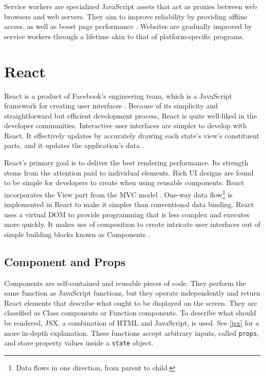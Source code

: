 Service workers are specialized JavaScript assets that act as proxies between web browsers and web servers. They aim to improve reliability by providing offline access, as well as boost page performance \autocite{chrome2021service}. Websites are gradually improved by service workers through a lifetime akin to that of platform-specific programs.


\section{React}
\label{react}
React is a product of Facebook's engineering team, which is a JavaScript framework for creating user interfaces \autocite{gackenheimer2015introducing}. Because of its simplicity and straightforward but efficient development process, React is quite well-liked in the developer communities. Interactive user interfaces are simpler to develop with React. It effectively updates by accurately drawing each state's view's constituent parts, and it updates the application's data \autocite{islam2017reactjs}.

React's primary goal is to deliver the best rendering performance. Its strength stems from the attention paid to individual elements. Rich UI designs are found to be simple for developers to create when using reusable components. React incorporates the View part from the MVC model \autocite{maratkar2021re}. One-way data flow\footnote{Data flows in one direction, from parent to child.} is implemented in React to make it simpler than conventional data binding. React uses a virtual DOM to provide programming that is less complex and executes more quickly. It makes use of composition to create intricate user interfaces out of simple building blocks known as Components \autocite{david2020building}.

\subsection{Component and Props}
Components are self-contained and reusable pieces of code. They perform the same function as JavaScript functions, but they operate independently and return React elements that describe what ought to be displayed on the screen. They are classified as Class components or Function components. To describe what should be rendered, JSX, a combination of HTML and JavaScript, is used. See \autoref{jsx} for a more in-depth explanation. These functions accept arbitrary inputs, called \texttt{props}, and store property values inside a \texttt{state} object.

